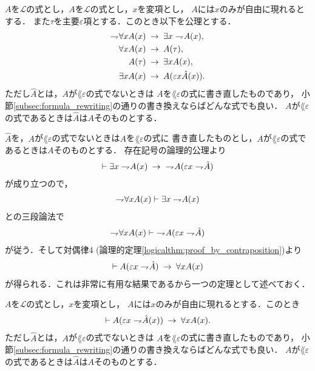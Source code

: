 	\begin{screen}
		\begin{logicalaxm}[量化記号に関する公理]
		\label{logicalaxm:rules_of_quantifiers}
			$A$を$\mathcal{L}$の式とし，$A$を$\mathcal{L}$の式とし，$x$を変項とし，
			$A$には$x$のみが自由に現れるとする．
			また$\tau$を主要$\varepsilon$項とする．このとき以下を公理とする．
			\begin{align}
				\rightharpoondown\hspace{-0.25em} \forall x A(x) &\hspace{0.25em}\rightarrow\hspace{0.25em} \exists x \rightharpoondown\hspace{-0.25em} A(x), \\
				\forall x A(x) &\hspace{0.25em}\rightarrow\hspace{0.25em} A(\tau), \\
				A(\tau) &\hspace{0.25em}\rightarrow\hspace{0.25em} \exists x A(x), \\
				\exists x A(x) &\hspace{0.25em}\rightarrow\hspace{0.25em} A(\varepsilon x \hat{A}(x)).
			\end{align}
			ただし$\hat{A}$とは，$A$が$\lang{\varepsilon}$の式でないときは
			$A$を$\lang{\varepsilon}$の式に書き直したものであり，
			小節\ref{subsec:formula_rewriting}の通りの書き換えならばどんな式でも良い．
			$A$が$\lang{\varepsilon}$の式であるときは$\hat{A}$は$A$そのものとする．
		\end{logicalaxm}
	\end{screen}
	
	$\hat{A}$を，$A$が$\lang{\varepsilon}$の式でないときは$A$を$\lang{\varepsilon}$の式に
	書き直したものとし，$A$が$\lang{\varepsilon}$の式であるときは$A$そのものとする．
	存在記号の論理的公理より
	\begin{align}
		\vdash \exists x \rightharpoondown\hspace{-0.25em} A(x) \hspace{0.25em}\rightarrow\hspace{0.25em}\ \rightharpoondown\hspace{-0.25em} A(\varepsilon x \rightharpoondown\hspace{-0.25em} \hat{A})
	\end{align}
	が成り立つので，
	\begin{align}
		\rightharpoondown\hspace{-0.25em} \forall x A(x) \vdash \exists x \rightharpoondown\hspace{-0.25em} A(x)
	\end{align}
	との三段論法で
	\begin{align}
		\rightharpoondown\hspace{-0.25em} \forall x A(x) \vdash\ \rightharpoondown\hspace{-0.25em} A(\varepsilon x \rightharpoondown\hspace{-0.25em} \hat{A})
	\end{align}
	が従う．そして対偶律4 (論理的定理\ref{logicalthm:proof_by_contraposition})より
	\begin{align}
		\vdash A(\varepsilon x \rightharpoondown\hspace{-0.25em} \hat{A}) \hspace{0.25em}\rightarrow\hspace{0.25em} \forall x A(x)
	\end{align}
	が得られる．これは非常に有用な結果であるから一つの定理として述べておく．
	
	\begin{screen}
		\begin{logicalthm}
		\label{logicalthm:derivation_of_universal_by_epsilon}
			$A$を$\mathcal{L}$の式とし，$x$を変項とし，
			$A$には$x$のみが自由に現れるとする．このとき
			\begin{align}
				\vdash A(\varepsilon x \rightharpoondown\hspace{-0.25em} \hat{A}(x)) \hspace{0.25em}\rightarrow\hspace{0.25em} \forall x A(x).
			\end{align}
			ただし$\hat{A}$とは，$A$が$\lang{\varepsilon}$の式でないときは
			$A$を$\lang{\varepsilon}$の式に書き直したものであり，
			小節\ref{subsec:formula_rewriting}の通りの書き換えならばどんな式でも良い．
			$A$が$\lang{\varepsilon}$の式であるときは$\hat{A}$は$A$そのものとする．
		\end{logicalthm}
	\end{screen}
	
